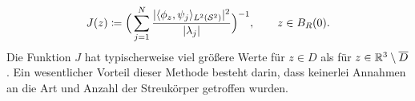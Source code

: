 \begin{equation*}
	J(z)\coloneqq\Big(\sum_{j=1}^N\frac{|\langle \phi_z, \psi_j\rangle_{L^2(\mathcal{S}^2)}|^2}{|\lambda_j|}\Big)^{-1},\qquad z\in B_R(0).
\end{equation*}
Die Funktion \(J\) hat typischerweise viel größere Werte für \(z\in D\) als für \(z\in\mathbb{R}^3\setminus\overline{D}\). Ein wesentlicher Vorteil dieser Methode besteht darin, dass keinerlei Annahmen an die Art und Anzahl der Streukörper getroffen wurden.




























